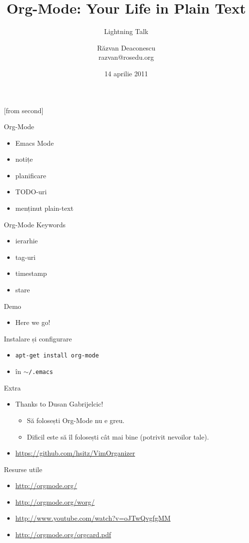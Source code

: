 \documentclass{beamer}
\title[Org-Mode]{Org-Mode: Your Life in Plain Text}
\subtitle{Lightning Talk}
\institute{Întâlnirile RLUG -- Aprilie 2011}
\author[Răzvan Deaconescu]{Răzvan Deaconescu\\
	razvan@rosedu.org}
\date{14 aprilie 2011}
\begin{document}
[from second]

\frame{\titlepage}

\begin{frame}{Org-Mode}
  \begin{itemize}
    \item Emacs Mode
    \item notițe
    \item planificare
    \item TODO-uri
    \item menținut plain-text
  \end{itemize}
\end{frame}

\begin{frame}{Org-Mode Keywords}
  \begin{itemize}
    \item ierarhie
    \item tag-uri
    \item timestamp
    \item stare
  \end{itemize}
\end{frame}

\begin{frame}{Demo}
  \begin{itemize}
    \item Here we go!
  \end{itemize}
\end{frame}

\begin{frame}{Instalare și configurare}
  \begin{itemize}
    \item \texttt{apt-get install org-mode}
    \item în \texttt{$\sim$/.emacs}
  \end{itemize}
  \begin{beamerboxesrounded}[lower=block body,shadow=true]{}
    \scriptsize 
  \end{beamerboxesrounded}
\end{frame}

\begin{frame}{Extra}
  \begin{itemize}
    \item Thanks to Dusan Gabrijelcic!
      \begin{itemize}
        \item Să folosești Org-Mode nu e greu.
        \item Dificil este să îl folosești cât mai bine (potrivit nevoilor
        tale).
      \end{itemize}
    \item \url{https://github.com/hsitz/VimOrganizer}
  \end{itemize}
\end{frame}

\begin{frame}{Resurse utile}
	\begin{itemize}
        \item \url{http://orgmode.org/}
        \item \url{http://orgmode.org/worg/}
		\item \url{http://www.youtube.com/watch?v=oJTwQvgfgMM}
        \item \url{http://orgmode.org/orgcard.pdf}
    \end{itemize}
\end{frame}
\end{document}
